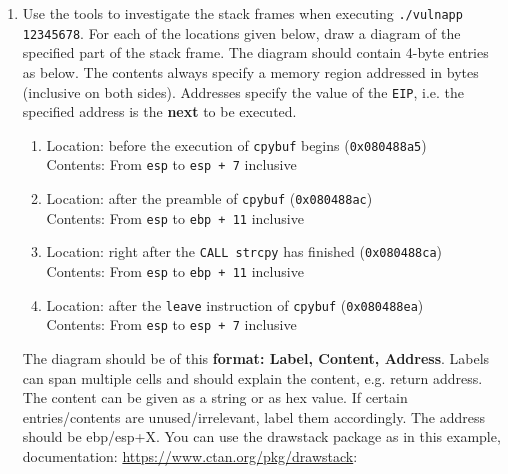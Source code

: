 \documentclass[a4paper,11pt]{article}
\begin{document}
\begin{enumerate}

\item Use the tools to investigate the stack frames when executing \texttt{./vulnapp 12345678}. For each of the locations given below, draw a diagram of the specified part of the stack frame. The diagram should contain 4-byte entries as below. The contents always specify a memory region addressed in bytes (inclusive on both sides). Addresses specify the value of the \texttt{EIP}, i.e. the specified address is the \textbf{next} to be executed.

\begin{enumerate}
\item Location: before the execution of \texttt{cpybuf} begins (\texttt{0x080488a5})\\
Contents: From \texttt{esp} to \texttt{esp + 7} inclusive
\item Location: after the preamble of \texttt{cpybuf} (\texttt{0x080488ac})\\
Contents: From \texttt{esp} to \texttt{ebp + 11} inclusive
\item Location: right after the \texttt{CALL strcpy} has finished (\texttt{0x080488ca})\\
Contents: From \texttt{esp} to \texttt{ebp + 11} inclusive
\item Location: after the \texttt{leave} instruction of \texttt{cpybuf} (\texttt{0x080488ea})\\
Contents: From \texttt{esp} to \texttt{esp + 7} inclusive

\end{enumerate} 

The diagram should be of this \textbf{format: Label, Content, Address}. Labels can span multiple cells and should explain the content, e.g. return address. The content can be given as a string or as hex value. If certain entries/contents are unused/irrelevant, label them accordingly. The address should be ebp/esp+X. You can use the drawstack package as in this example, documentation: \url{https://www.ctan.org/pkg/drawstack}:

\begin{drawstack}
  \startframe
   
   
   \ebp 
   
  \startframe
   \esp
\end{drawstack}


\end{enumerate}
\end{document}
